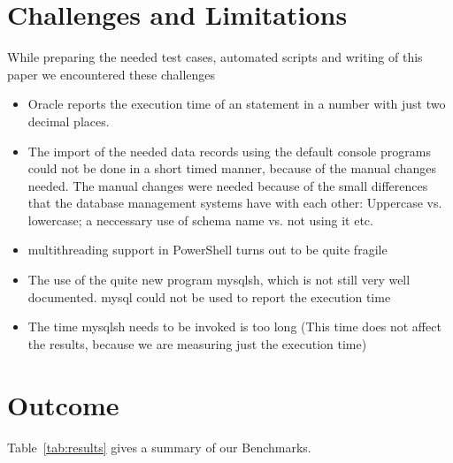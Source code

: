 \documentclass[runningheads]{llncs}
\begin{document}
\section{Challenges and Limitations}
While preparing the needed test cases, automated scripts and writing of this paper we encountered these challenges
\begin{itemize}
    \item Oracle reports the execution time of an statement in a number with just two decimal places.
    \item The import of the needed data records using the default console programs could not be done in a short timed manner, because of the manual changes needed. The manual changes were needed because of the small differences that the database management systems have with each other: Uppercase vs. lowercase; a neccessary use of schema name vs. not using it etc.
    \item multithreading support in PowerShell turns out to be quite fragile
    \item The use of the quite new program mysqlsh, which is not still very well documented. mysql could not be used to report the execution time
    \item The time mysqlsh needs to be invoked is too long (This time does not affect the results, because we are measuring just the execution time)
\end{itemize}
\section{Outcome}

Table~\ref{tab:results} gives a summary of our Benchmarks.
\end{document}
